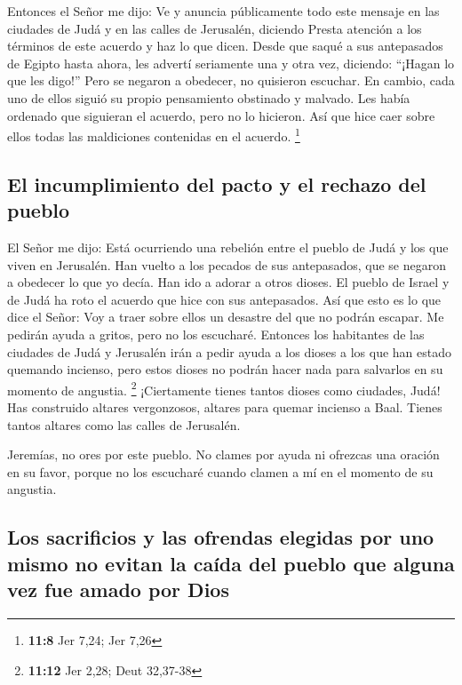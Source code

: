 Entonces el Señor me dijo: Ve y anuncia públicamente todo
este mensaje en las ciudades de Judá y en las calles de Jerusalén,
diciendo Presta atención a los términos de este acuerdo y haz lo que
dicen.  Desde que saqué a sus antepasados de Egipto hasta
ahora, les advertí seriamente una y otra vez, diciendo: ``¡Hagan lo que
les digo!''  Pero se negaron a obedecer, no quisieron
escuchar. En cambio, cada uno de ellos siguió su propio pensamiento
obstinado y malvado. Les había ordenado que siguieran el acuerdo, pero
no lo hicieron. Así que hice caer sobre ellos todas las maldiciones
contenidas en el acuerdo. \footnote{\textbf{11:8} Jer 7,24; Jer 7,26}

\hypertarget{el-incumplimiento-del-pacto-y-el-rechazo-del-pueblo}{%
\subsection{El incumplimiento del pacto y el rechazo del
pueblo}\label{el-incumplimiento-del-pacto-y-el-rechazo-del-pueblo}}

 El Señor me dijo: Está ocurriendo una rebelión entre el
pueblo de Judá y los que viven en Jerusalén.  Han vuelto
a los pecados de sus antepasados, que se negaron a obedecer lo que yo
decía. Han ido a adorar a otros dioses. El pueblo de Israel y de Judá ha
roto el acuerdo que hice con sus antepasados.  Así que
esto es lo que dice el Señor: Voy a traer sobre ellos un desastre del
que no podrán escapar. Me pedirán ayuda a gritos, pero no los escucharé.
 Entonces los habitantes de las ciudades de Judá y
Jerusalén irán a pedir ayuda a los dioses a los que han estado quemando
incienso, pero estos dioses no podrán hacer nada para salvarlos en su
momento de angustia. \footnote{\textbf{11:12} Jer 2,28; Deut 32,37-38}
 ¡Ciertamente tienes tantos dioses como ciudades, Judá!
Has construido altares vergonzosos, altares para quemar incienso a Baal.
Tienes tantos altares como las calles de Jerusalén.

 Jeremías, no ores por este pueblo. No clames por ayuda
ni ofrezcas una oración en su favor, porque no los escucharé cuando
clamen a mí en el momento de su angustia.

\hypertarget{los-sacrificios-y-las-ofrendas-elegidas-por-uno-mismo-no-evitan-la-cauxedda-del-pueblo-que-alguna-vez-fue-amado-por-dios}{%
\subsection{Los sacrificios y las ofrendas elegidas por uno mismo no
evitan la caída del pueblo que alguna vez fue amado por
Dios}\label{los-sacrificios-y-las-ofrendas-elegidas-por-uno-mismo-no-evitan-la-cauxedda-del-pueblo-que-alguna-vez-fue-amado-por-dios}}

